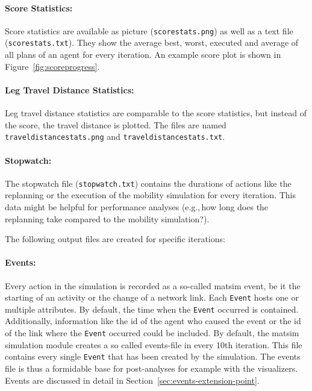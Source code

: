 \paragraph{Score Statistics:}
Score statistics are available as picture (\lstinline|scorestats.png|) as well as a text file (\lstinline|scorestats.txt|). They show the average best, worst, executed and average of all plans of an agent for every iteration. An example score plot is shown in Figure~\ref{fig:scoreprogress}.

\paragraph{Leg Travel Distance Statistics:}
Leg travel distance statistics are comparable to the score statistics, but instead of the score, the travel distance is plotted. The files are named \lstinline|traveldistancestats.png| and \lstinline|traveldistancestats.txt|.

\paragraph{Stopwatch:}
The stopwatch file (\lstinline|stopwatch.txt|) contains the durations of actions like the replanning or the execution of the mobility simulation for every iteration. This data might be helpful for performance analyses (e.g.,\,how long does the replanning take compared to the mobility simulation?).


The following output files are created for specific iterations:

\paragraph{Events:} Every action in the simulation is recorded as a so-called \gls{matsim} event, be it the starting of an activity or the change of a network link. Each \lstinline|Event| hosts one or multiple attributes. By default, the time when the \lstinline|Event| occurred is contained. Additionally, information like the id of the agent who caused the event or the id of the link where the \lstinline|Event| occurred could be included. By default, the \gls{matsim} simulation module creates a so called events-file in every 10th iteration. This file contains every single \lstinline|Event| that has been created by the simulation. The events file is thus a formidable base for post-analyses for example with the visualizers. Events are discussed in detail in Section~\ref{sec:events-extension-point}.

